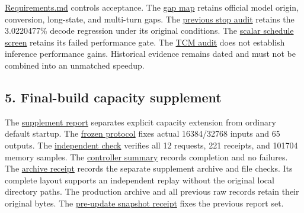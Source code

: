 \documentclass[10pt,a4paper]{article}
\begin{document}
\href{https://github.com/MoyaMryia/riscv-accl/blob/main/Requirements.md}{Requirements.md}
controls acceptance. The
\href{https://github.com/MoyaMryia/riscv-accl/blob/main/spacemit/reports/2026-10-13-requirements-gap.md}{gap
map} retains official model origin, conversion, long-state, and
multi-turn gaps. The
\href{https://github.com/MoyaMryia/riscv-accl/blob/main/spacemit/reports/2026-10-12-combined-stop-audit.md}{previous
stop audit} retains the 3.0220477\% decode regression under its original
conditions. The
\href{https://github.com/MoyaMryia/riscv-accl/blob/main/spacemit/reports/2026-10-13-k1-live-inspect-and-scalar-schedule.md}{scalar
schedule screen} retains its failed performance gate. The
\href{https://github.com/MoyaMryia/riscv-accl/blob/main/spacemit/reports/2026-10-13-k1-tcm-access.md}{TCM
audit} does not establish inference performance gains. Historical
evidence remains dated and must not be combined into an unmatched
speedup.

\hypertarget{final-build-capacity-supplement}{%
\subsection{5. Final-build capacity
supplement}\label{final-build-capacity-supplement}}

The
\href{https://github.com/MoyaMryia/riscv-accl/blob/main/spacemit/reports/2026-10-16-ultralong-final-comparison.md}{supplement
report} separates explicit capacity extension from ordinary default
startup. The
\href{https://github.com/MoyaMryia/riscv-accl/blob/main/spacemit/reports/raw/k1-ultralong-20261016-r1/PROTOCOL.md}{frozen
protocol} fixes actual 16384/32768 inputs and 65 outputs. The
\href{https://github.com/MoyaMryia/riscv-accl/blob/main/spacemit/reports/raw/k1-ultralong-20261016-r1/verification-v2.json}{independent
check} verifies all 12 requests, 221 receipts, and 101704 memory
samples. The
\href{https://github.com/MoyaMryia/riscv-accl/blob/main/spacemit/reports/raw/k1-ultralong-20261016-r1/board/k1-ultralong-20261014-r1/results/summary.json}{controller
summary} records completion and no failures. The
\href{https://github.com/MoyaMryia/riscv-accl/blob/main/spacemit/reports/raw/k1-ultralong-20261016-r1/archive-receipt.json}{archive
receipt} records the separate supplement archive and file checks. Its
complete layout supports an independent replay without the original
local directory paths. The production archive and all previous raw
records retain their original bytes. The
\href{https://github.com/MoyaMryia/riscv-accl/blob/main/spacemit/reports/snapshots/2026-10-14-final-r3/snapshot-receipt.json}{pre-update
snapshot receipt} fixes the previous report set.
\end{document}
